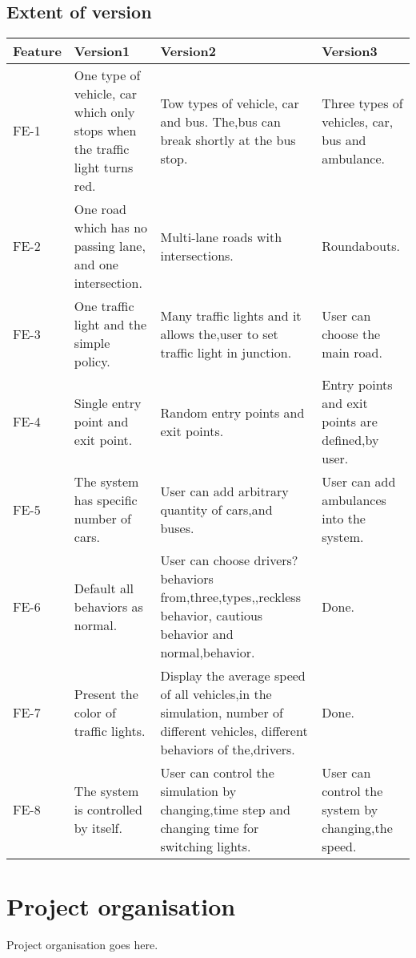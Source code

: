 \documentclass[a4paper,12pt]{article}
\begin{document}
\subsection{Extent of version}
\begin{table}[!htbp]
\centering
\begin{tabular}{|p{1.2cm}|p{3.8cm}|p{4.5cm}|p{3cm}|}
\hline
Feature & Version1 & Version2  & Version3\\
\hline
FE-1& One type of vehicle, car which only stops when the traffic light turns red. & Tow types of vehicle, car and bus. The,bus can break shortly at the bus stop. & Three types of vehicles, car, bus and ambulance.\\
\hline
FE-2& One road which has no passing lane, and one intersection. & Multi-lane roads with intersections. & Roundabouts.\\
\hline
FE-3& One traffic light and the simple policy. & Many traffic lights and it allows the,user to set traffic light in junction. & User can choose the main road.\\
\hline
FE-4& Single entry point and exit point. & Random entry points and exit points. & Entry points and exit points are defined,by user.\\
\hline
FE-5& The system has specific number of cars. & User can add arbitrary quantity of cars,and buses. & User can add ambulances into the system.\\
\hline
FE-6& Default all behaviors as normal. & User can choose drivers? behaviors from,three,types,,reckless behavior, cautious behavior and normal,behavior. & Done.\\
\hline
FE-7& Present the color of traffic lights. & Display the average speed of all vehicles,in the simulation, number of different vehicles, different behaviors of the,drivers. & Done.\\
\hline
FE-8& The system is controlled by itself. & User can control the simulation by changing,time step and changing time for switching lights. & User can control the system by changing,the speed.\\
\hline
\end{tabular}
\end{table}


\section{Project organisation}
Project organisation goes here.
\end{document}
